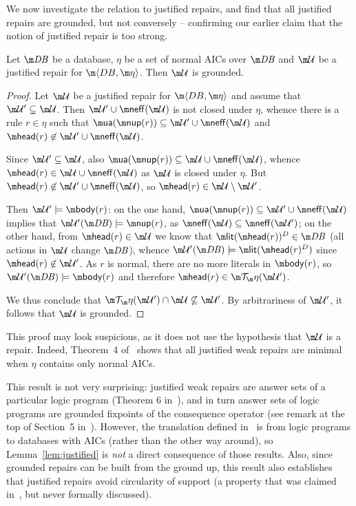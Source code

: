 We now investigate the relation to justified repairs, and find that all justified repairs are grounded, but not conversely -- confirming our earlier claim that the notion of justified repair is too strong.

\begin{lemma}
  \label{lem:justified}
  Let $\db$ be a database, $\eta$ be a set of normal AICs over $\db$ and $\UU$ be a justified repair for $\fulldb$.
  Then $\UU$ is grounded.
\end{lemma}
\begin{proof}
  Let $\UU$ be a justified repair for $\fulldb$ and assume that $\UU'\subsetneq\UU$.
  Then $\UU'\cup\neff(\UU)$ is not closed under $\eta$, whence there is a rule $r\in\eta$ such that $\actof(\nup(r))\subseteq\UU'\cup\neff(\UU)$ and $\head(r)\not\in\UU'\cup\neff(\UU)$.

  Since $\UU'\subseteq\UU$, also $\actof(\nup(r))\subseteq\UU\cup\neff(\UU)$, whence $\head(r)\in\UU\cup\neff(\UU)$ as $\UU$ is closed under $\eta$.
  But $\head(r)\not\in\UU'\cup\neff(\UU)$, so $\head(r)\in\UU\setminus\UU'$.

  Then $\UU'\models\body(r)$: on the one hand, $\actof(\nup(r))\subseteq\UU'\cup\neff(\UU)$ implies that $\UU'(\db)\models\nup(r)$, as $\neff(\UU)\subseteq\neff(\UU')$; on the other hand, from $\head(r)\in\UU$ we know that $\litof(\head(r))^D\in\db$ (all actions in $\UU$ change $\db$), whence $\UU'(\db)\models\litof(\head(r)^D)$ since $\head(r)\not\in\UU'$.
  As $r$ is normal, there are no more literals in $\body(r)$, so $\UU'(\db)\models\body(r)$ and therefore $\head(r)\in\Op(\UU')$.

  We thus conclude that $\Op(\UU')\cap\UU\not\subseteq\UU'$.
  By arbitrariness of $\UU'$, it follows that $\UU$ is grounded.
\end{proof}
This proof may look suspicious, as it does not use the hypothesis that $\UU$ is a repair.
Indeed, Theorem~4 of~\cite{Caroprese2011} shows that all justified weak repairs are minimal when $\eta$ contains only normal AICs.

This result is not very surprising: justified weak repairs are answer sets of a particular logic program (Theorem 6 in~\cite{Caroprese2011}), and in turn answer sets of logic programs are grounded fixpoints of the consequence operator (see remark at the top of Section~5 in~).
However, the translation defined in~\cite{Caroprese2011} is from logic programs to databases with AICs (rather than the other way around), so Lemma~\ref{lem:justified} is \emph{not} a direct consequence of those results.
Also, since grounded repairs can be built from the ground up, this result also establishes that justified repairs avoid circularity of support (a property that was claimed in~\cite{Caroprese2011}, but never formally discussed).

